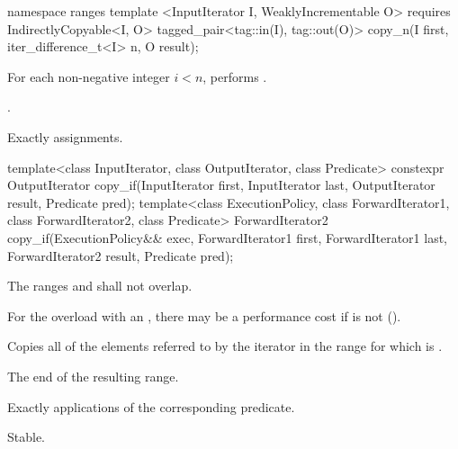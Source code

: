 \begin{addedblock}
%
\begin{itemdecl}
namespace ranges {
  template <InputIterator I, WeaklyIncrementable O>
      requires IndirectlyCopyable<I, O>
    tagged_pair<tag::in(I), tag::out(O)> copy_n(I first, iter_difference_t<I> n, O result);
}
\end{itemdecl}

\begin{itemdescr}
\pnum
\effects For each non-negative integer
$i < n$, performs .

\pnum
\returns {}.

\pnum
\complexity Exactly  assignments.
\end{itemdescr}
\end{addedblock}

%
\begin{itemdecl}
template<class InputIterator, class OutputIterator, class Predicate>
  constexpr OutputIterator copy_if(InputIterator first, InputIterator last,
                                   OutputIterator result, Predicate pred);
template<class ExecutionPolicy, class ForwardIterator1, class ForwardIterator2,
         class Predicate>
  ForwardIterator2 copy_if(ExecutionPolicy&& exec,
                           ForwardIterator1 first, ForwardIterator1 last,
                           ForwardIterator2 result, Predicate pred);
\end{itemdecl}

\begin{itemdescr}
\pnum
\requires The ranges  and  shall not overlap.
\begin{note}
For the overload with an , there may be a performance
cost if  is not
 ().
\end{note}

\pnum
\effects Copies all of the elements referred to by the iterator  in the range 
for which  is .

\pnum
\returns The end of the resulting range.

\pnum
\complexity Exactly  applications of the corresponding predicate.

\pnum
\remarks Stable.
\end{itemdescr}

